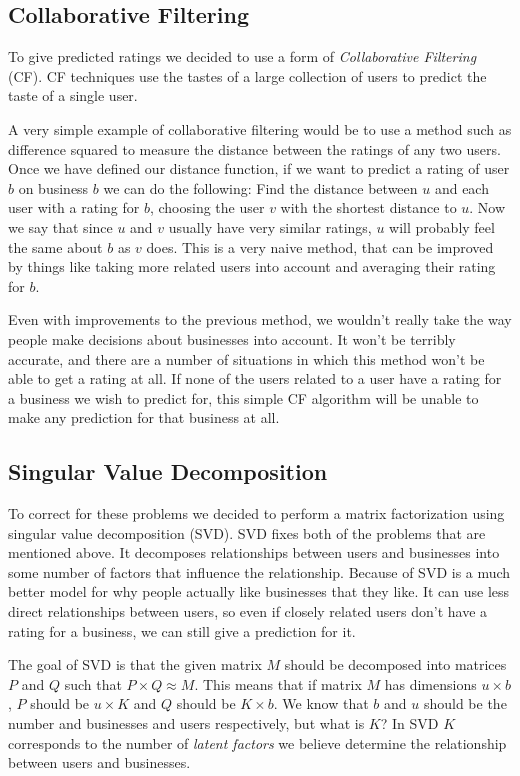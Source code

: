 \subsection{Collaborative Filtering}

To give predicted ratings we decided to use a form of \emph{Collaborative
Filtering} (CF). CF techniques use the tastes of a large collection of users to
predict the taste of a single user.

A very simple example of collaborative filtering would be to use a method such
as difference squared to measure the distance between the ratings of any two
users. Once we have defined our distance function, if we want to predict a
rating of user $b$ on business $b$ we can do the following: Find the distance
between $u$ and each user with a rating for $b$, choosing the user $v$ with the
shortest distance to $u$. Now we say that since $u$ and $v$ usually have very
similar ratings, $u$ will probably feel the same about $b$ as $v$ does. This is
a very naive method, that can be improved by things like taking more related
users into account and averaging their rating for $b$.

Even with improvements to the previous method, we wouldn't really take the way
people make decisions about businesses into account. It won't be terribly
accurate, and there are a number of situations in which this method won't be
able to get a rating at all. If none of the users related to a user have a
rating for a business we wish to predict for, this simple CF algorithm will be
unable to make any prediction for that business at all. 

\subsection{Singular Value Decomposition}
To correct for these problems we decided to perform a matrix factorization
using singular value decomposition (SVD). SVD fixes both of the problems that
are mentioned above. It decomposes relationships between users and businesses
into some number of factors that influence the relationship. Because of SVD is
a much better model for why people actually like businesses that they like. It
can use less direct relationships between users, so even if closely related
users don't have a rating for a business, we can still give a prediction for it.

The goal of SVD is that the given matrix $M$ should be decomposed into
matrices $P$ and $Q$ such that $P \times Q \approx M $. This means that if
matrix $M$ has dimensions $u \times b$, $P$ should be $u \times K$ and $Q$
should be $K \times b$. We know that $b$ and $u$ should be the number and
businesses and users respectively, but what is $K$? In SVD $K$ corresponds to
the number of \emph{latent factors} we believe determine the relationship
between users and businesses.


